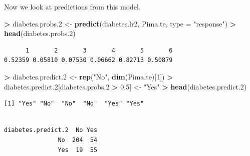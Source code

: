 \documentclass[
]{krantz}
\makeatletter
\newenvironment{Shaded}{\begin{snugshade}}{\end{snugshade}}
\newcommand{\DataTypeTok}[1]{\textcolor[rgb]{0.27,0.27,0.27}{#1}}
\newcommand{\DecValTok}[1]{\textcolor[rgb]{0.06,0.06,0.06}{#1}}
\newcommand{\FloatTok}[1]{\textcolor[rgb]{0.06,0.06,0.06}{#1}}
\newcommand{\KeywordTok}[1]{\textcolor[rgb]{0.27,0.27,0.27}{\textbf{#1}}}
\newcommand{\NormalTok}[1]{#1}
\newcommand{\OperatorTok}[1]{\textcolor[rgb]{0.43,0.43,0.43}{\textbf{#1}}}
\newcommand{\StringTok}[1]{\textcolor[rgb]{0.5,0.5,0.5}{#1}}
\newenvironment{kframe}{%
\medskip{}
\setlength{\fboxsep}{.8em}
 \def\at@end@of@kframe{}%
 \ifinner\ifhmode%
  \def\at@end@of@kframe{\end{minipage}}%
  \begin{minipage}{\columnwidth}%
 \fi\fi%
 \def\FrameCommand##1{\hskip\@totalleftmargin \hskip-\fboxsep
 \colorbox{shadecolor}{##1}\hskip-\fboxsep
     \hskip-\linewidth \hskip-\@totalleftmargin \hskip\columnwidth}%
 \MakeFramed {\advance\hsize-\width
   \@totalleftmargin\z@ \linewidth\hsize
   \@setminipage}}%
 {\par\unskip\endMakeFramed%
 \at@end@of@kframe}
\renewenvironment{Shaded}{\begin{kframe}}{\end{kframe}}
\makeatother
\begin{document}
Now we look at predictions from this model.

\begin{Shaded}
\begin{Highlighting}[]
\OperatorTok{\textgreater{}}\StringTok{ }\NormalTok{diabetes.probs}\FloatTok{.2}\NormalTok{ \textless{}{-}}\StringTok{ }\KeywordTok{predict}\NormalTok{(diabetes.lr2, Pima.te, }\DataTypeTok{type =} \StringTok{"response"}\NormalTok{)}
\OperatorTok{\textgreater{}}\StringTok{ }\KeywordTok{head}\NormalTok{(diabetes.probs}\FloatTok{.2}\NormalTok{)}
\end{Highlighting}
\end{Shaded}

\begin{verbatim}
      1       2       3       4       5       6 
0.52359 0.05810 0.07530 0.06662 0.82713 0.50879 
\end{verbatim}

\begin{Shaded}
\begin{Highlighting}[]
\OperatorTok{\textgreater{}}\StringTok{ }\NormalTok{diabetes.predict}\FloatTok{.2}\NormalTok{ \textless{}{-}}\StringTok{ }\KeywordTok{rep}\NormalTok{(}\StringTok{"No"}\NormalTok{, }\KeywordTok{dim}\NormalTok{(Pima.te)[}\DecValTok{1}\NormalTok{])}
\OperatorTok{\textgreater{}}\StringTok{ }\NormalTok{diabetes.predict}\FloatTok{.2}\NormalTok{[diabetes.probs}\FloatTok{.2} \OperatorTok{\textgreater{}}\StringTok{ }\FloatTok{0.5}\NormalTok{] \textless{}{-}}\StringTok{ "Yes"}
\OperatorTok{\textgreater{}}\StringTok{ }\KeywordTok{head}\NormalTok{(diabetes.predict}\FloatTok{.2}\NormalTok{)}
\end{Highlighting}
\end{Shaded}

\begin{verbatim}
[1] "Yes" "No"  "No"  "No"  "Yes" "Yes"
\end{verbatim}

\begin{Shaded}
\end{Shaded}

\begin{verbatim}
                  
diabetes.predict.2  No Yes
               No  204  54
               Yes  19  55
\end{verbatim}
\end{document}
